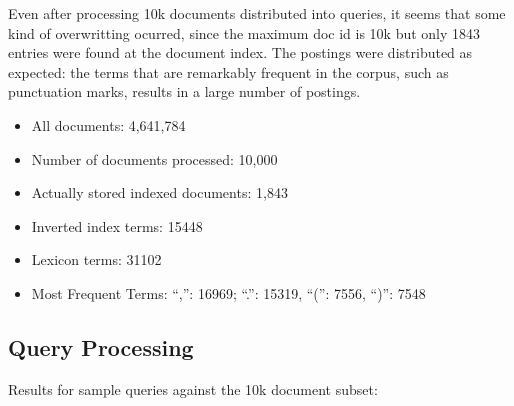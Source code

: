 Even after processing 10k documents distributed into queries, it seems that some kind of overwritting ocurred, since the maximum doc id is 10k but only 1843 entries were found at the document index. The postings were distributed as expected: the terms that are remarkably frequent in the corpus, such as punctuation marks, results in a large number of postings.

\begin{itemize}
  \item All documents: 4,641,784
  \item Number of documents processed: 10,000
  \item Actually stored indexed documents: 1,843
  \item Inverted index terms: 15448
  \item Lexicon terms: 31102
  \item Most Frequent Terms: ``,'': 16969; ``.'': 15319, ``('': 7556, ``)'': 7548
\end{itemize}

\subsection{Query Processing}

Results for sample queries against the 10k document subset:


